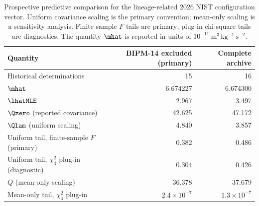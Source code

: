 \begin{table}[htbp]
\centering
\caption{Prospective predictive comparison for the lineage-related 2026 NIST configuration vector. Uniform covariance scaling is the primary convention; mean-only scaling is a sensitivity analysis. Finite-sample $F$ tails are primary; plug-in chi-square tails are diagnostics. The quantity $\mhat$ is reported in units of $10^{-11}\ \mathrm{m^{3}\,kg^{-1}\,s^{-2}}$.}
\label{tab:prospective}
\small
\begin{tabular}{lrr}
\toprule
Quantity & BIPM-14 excluded (primary) & Complete archive \\
\midrule
Historical determinations & 15 & 16 \\
$\mhat$ & 6.674227 & 6.674300 \\
$\lhatMLE$ & 2.967 & 3.497 \\
$\Qzero$ (reported covariance) & 42.625 & 47.172 \\
$\Qlam$ (uniform scaling) & 4.840 & 3.857 \\
Uniform tail, finite-sample $F$ (primary) & 0.382 & 0.486 \\
Uniform tail, $\chi^{2}_{4}$ plug-in (diagnostic) & 0.304 & 0.426 \\
$Q$ (mean-only scaling) & 36.378 & 37.679 \\
Mean-only tail, $\chi^{2}_{4}$ plug-in & $2.4 \times 10^{-7}$ & $1.3 \times 10^{-7}$ \\
\bottomrule
\end{tabular}
\end{table}
